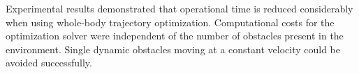 Experimental results demonstrated that operational time is reduced considerably when using whole-body trajectory optimization. Computational costs for the optimization solver were independent of the number of obstacles present in the environment. Single dynamic obstacles moving at a constant velocity could be avoided successfully.


